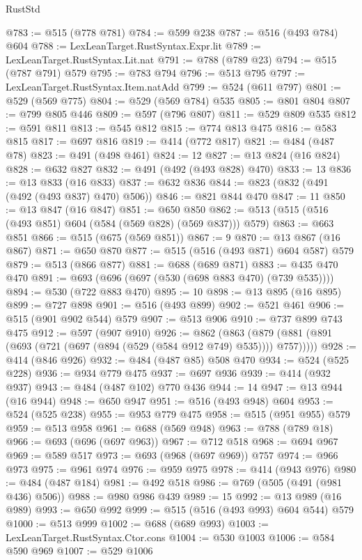 \begin{lexlean}{RustStd}
\begin{coremodule}
{\begin{coremodule}
{{{{{{{{{{{{{@783 := @515 (@778 @781)
@784 := @599 @238
@787 := @516 (@493 @784) @604
@788 := LexLeanTarget.RustSyntax.Expr.lit
@789 := LexLeanTarget.RustSyntax.Lit.nat
@791 := @788 (@789 @23)
@794 := @515 (@787 @791) @579
@795 := @783 @794
@796 := @513 @795
@797 := LexLeanTarget.RustSyntax.Item.natAdd
@799 := @524 (@611 @797)
@801 := @529 (@569 @775)
@804 := @529 (@569 @784) @535
@805 := @801 @804
@807 := @799 @805 @446
@809 := @597 (@796 @807)
@811 := @529 @809 @535
@812 := @591 @811
@813 := @545 @812
@815 := @774 @813 @475
@816 := @583 @815
@817 := @697 @816
@819 := @414 (@772 @817)
@821 := @484 (@487 @78)
@823 := @491 (@498 @461)
@824 := 12
@827 := @13 @824 (@16 @824)
@828 := @632 @827
@832 := @491 (@492 (@493 @828) @470)
@833 := 13
@836 := @13 @833 (@16 @833)
@837 := @632 @836
@844 := @823 (@832 (@491 (@492 (@493 @837) @470) @506))
@846 := @821 @844 @470
@847 := 11
@850 := @13 @847 (@16 @847)
@851 := @650 @850
@862 := @513 (@515 (@516 (@493 @851) @604 (@584 (@569 @828) (@569 @837))) @579)
@863 := @663 @851
@866 := @515 (@675 (@569 @851))
@867 := 9
@870 := @13 @867 (@16 @867)
@871 := @650 @870
@877 := @515 (@516 (@493 @871) @604 @587) @579
@879 := @513 (@866 @877)
@881 := @688 (@689 @871)
@883 := @435 @470 @470
@891 := @693 (@696 (@697 (@530 (@698 @883 @470) (@739 @535))))
@894 := @530 (@722 @883 @470)
@895 := 10
@898 := @13 @895 (@16 @895)
@899 := @727 @898
@901 := @516 (@493 @899)
@902 := @521 @461
@906 := @515 (@901 @902 @544) @579
@907 := @513 @906
@910 := @737 @899 @743 @475
@912 := @597 (@907 @910)
@926 := @862
    (@863 (@879 (@881 (@891 (@693 (@721 (@697 (@894 (@529 (@584 @912 @749) @535)))) @757)))))
@928 := @414 (@846 @926)
@932 := @484 (@487 @85) @508 @470
@934 := @524 (@525 @228)
@936 := @934 @779 @475
@937 := @697 @936
@939 := @414 (@932 @937)
@943 := @484 (@487 @102) @770 @436
@944 := 14
@947 := @13 @944 (@16 @944)
@948 := @650 @947
@951 := @516 (@493 @948) @604
@953 := @524 (@525 @238)
@955 := @953 @779 @475
@958 := @515 (@951 @955) @579
@959 := @513 @958
@961 := @688 (@569 @948)
@963 := @788 (@789 @18)
@966 := @693 (@696 (@697 @963))
@967 := @712 @518
@968 := @694 @967
@969 := @589 @517
@973 := @693 (@968 (@697 @969)) @757
@974 := @966 @973
@975 := @961 @974
@976 := @959 @975
@978 := @414 (@943 @976)
@980 := @484 (@487 @184)
@981 := @492 @518
@986 := @769 (@505 (@491 (@981 @436) @506))
@988 := @980 @986 @439
@989 := 15
@992 := @13 @989 (@16 @989)
@993 := @650 @992
@999 := @515 (@516 (@493 @993) @604 @544) @579
@1000 := @513 @999
@1002 := @688 (@689 @993)
@1003 := LexLeanTarget.RustSyntax.Ctor.cons
@1004 := @530 @1003
@1006 := @584 @590 @969
@1007 := @529 @1006
}}}}}}}}}}}}}
\end{coremodule}}
\end{coremodule}
\end{lexlean}
